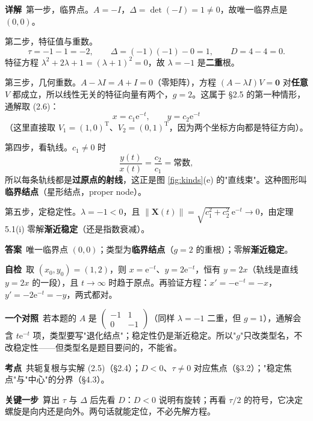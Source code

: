 \documentclass[11pt]{ctexart}
\renewcommand{\qbreak}{\needspace{0.26\textheight}}
\newcommand{\qpagebreak}{\needspace{0.92\textheight}}
\newcommand{\X}{\mathbf{X}}\newcommand{\Y}{\mathbf{Y}}
\newcommand{\norm}[1]{\left\lVert#1\right\rVert}
\begin{document}
\textbf{详解}\
第一步，临界点。$A=-I$，$\Delta=\det(-I)=1\neq0$，故唯一临界点是 $(0,0)$。

第二步，特征值与重数。
\[
\tau=-1-1=-2,\qquad \Delta=(-1)(-1)-0=1,\qquad D=4-4=0 .
\]
特征方程 $\lambda^{2}+2\lambda+1=(\lambda+1)^{2}=0$，故 $\lambda=-1$ 是\textbf{二重}根。

第三步，几何重数。$A-\lambda I=A+I=0$（零矩阵），方程 $(A-\lambda I)V=\mathbf{0}$ 对\textbf{任意} $V$ 都成立，所以线性无关的特征向量有两个，$g=2$。这属于 §2.5 的第一种情形，通解取 (2.6)：
\[
x=c_1\mathrm{e}^{-t},\qquad y=c_2\mathrm{e}^{-t}
\]
（这里直接取 $V_1=(1,0)^{\mathrm T}$、$V_2=(0,1)^{\mathrm T}$，因为两个坐标方向都是特征方向）。

第四步，看轨线。$c_1\neq0$ 时
\[
\frac{y(t)}{x(t)}=\frac{c_2}{c_1}=\text{常数},
\]
所以每条轨线都是\textbf{过原点的射线}，这正是图 \ref{fig:kinds}(e) 的"直线束"。这种图形叫\textbf{临界结点}（星形结点，proper node）。

第五步，定稳定性。$\lambda=-1<0$，且 $\norm{\X(t)}=\sqrt{c_1^{2}+c_2^{2}}\,\mathrm{e}^{-t}\to0$，由定理 5.1(i) 零解\textbf{渐近稳定}（还是指数衰减）。

\textbf{答案}\ 唯一临界点 $(0,0)$；类型为\textbf{临界结点}（$g=2$ 的重根）；零解\textbf{渐近稳定}。

\textbf{自检}\ 取 $(x_0,y_0)=(1,2)$，则 $x=\mathrm{e}^{-t}$、$y=2\mathrm{e}^{-t}$，恒有 $y=2x$（轨线是直线 $y=2x$ 的一段），且 $t\to\infty$ 时趋于原点。再验证方程：$x'=-\mathrm{e}^{-t}=-x$，$y'=-2\mathrm{e}^{-t}=-y$，两式都对。

\textbf{一个对照}\ 若本题的 $A$ 是 $\begin{pmatrix}-1&1\\0&-1\end{pmatrix}$（同样 $\lambda=-1$ 二重，但 $g=1$），通解会含 $t\mathrm{e}^{-t}$ 项，类型要写"退化结点"；稳定性仍是渐近稳定。所以"$g$"只改类型名，不改稳定性——但类型名是题目要问的，不能省。

\qpagebreak
\qbreak
{}
\label{app:a3}

\textbf{考点}\ 共轭复根与实解 (2.5)（§2.4）；$D<0$、$\tau\neq0$ 对应焦点（§3.2）；"稳定焦点"与"中心"的分界（§4.3）。

\textbf{关键一步}\ 算出 $\tau$ 与 $\Delta$ 后先看 $D$：$D<0$ 说明有旋转；再看 $\tau/2$ 的符号，它决定螺旋是向内还是向外。两句话就能定位，不必先解方程。
\end{document}
